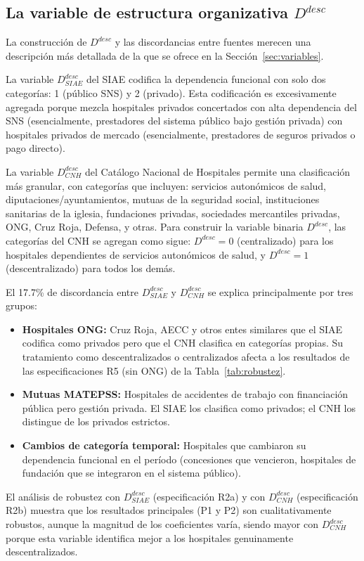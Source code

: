 \subsection{La variable de estructura organizativa \texorpdfstring{$D^{desc}$}{D\^{}desc}}

La construcción de $D^{desc}$ y las discordancias entre fuentes merecen una descripción más detallada de la que se ofrece en la Sección~\ref{sec:variables}.

La variable $D^{desc}_{SIAE}$ del SIAE codifica la dependencia funcional con solo dos categorías: 1 (público SNS) y 2 (privado). Esta codificación es excesivamente agregada porque mezcla hospitales privados concertados con alta dependencia del SNS (esencialmente, prestadores del sistema público bajo gestión privada) con hospitales privados de mercado (esencialmente, prestadores de seguros privados o pago directo).

La variable $D^{desc}_{CNH}$ del Catálogo Nacional de Hospitales permite una clasificación más granular, con categorías que incluyen: servicios autonómicos de salud, diputaciones/ayuntamientos, mutuas de la seguridad social, instituciones sanitarias de la iglesia, fundaciones privadas, sociedades mercantiles privadas, ONG, Cruz Roja, Defensa, y otras. Para construir la variable binaria $D^{desc}$, las categorías del CNH se agregan como sigue: $D^{desc} = 0$ (centralizado) para los hospitales dependientes de servicios autonómicos de salud, y $D^{desc} = 1$ (descentralizado) para todos los demás.

El 17.7\% de discordancia entre $D^{desc}_{SIAE}$ y $D^{desc}_{CNH}$ se explica principalmente por tres grupos:

\begin{itemize}
  \item \textbf{Hospitales ONG:} Cruz Roja, AECC y otros entes similares que el SIAE codifica como privados pero que el CNH clasifica en categorías propias. Su tratamiento como descentralizados o centralizados afecta a los resultados de las especificaciones R5 (sin ONG) de la Tabla~\ref{tab:robustez}.
  \item \textbf{Mutuas MATEPSS:} Hospitales de accidentes de trabajo con financiación pública pero gestión privada. El SIAE los clasifica como privados; el CNH los distingue de los privados estrictos.
  \item \textbf{Cambios de categoría temporal:} Hospitales que cambiaron su dependencia funcional en el período (concesiones que vencieron, hospitales de fundación que se integraron en el sistema público).
\end{itemize}

El análisis de robustez con $D^{desc}_{SIAE}$ (especificación R2a) y con $D^{desc}_{CNH}$ (especificación R2b) muestra que los resultados principales (P1 y P2) son cualitativamente robustos, aunque la magnitud de los coeficientes varía, siendo mayor con $D^{desc}_{CNH}$ porque esta variable identifica mejor a los hospitales genuinamente descentralizados.



